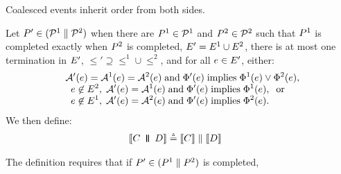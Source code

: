 Coalesced events inherit order from both sides.
\begin{definition}
  \label{def:par}
  Let $P' \in (\mathcal{P}^1 \parallel \mathcal{P}^2)$
  when there are $P^1 \in \mathcal{P}^1$ and $P^2 \in \mathcal{P}^2$
  such that
$P^1$ is completed exactly when $P^2$ is completed,
$E' = E^1 \cup E^2$,
there is at most one termination in $E'$,
${\le'}\supseteq{\le^1}\cup{\le^2}$,
and for all $e\in E'$,
either:
\begin{gather*}
  \begin{aligned}
    \;\;&\mathcal{A}'(e) = \mathcal{A}^1(e) = \mathcal{A}^2(e) \;\allowbreak\text{and}\allowbreak\; \Phi'(e) \; \allowbreak\text{implies}\allowbreak\; \Phi^1(e) \lor \Phi^2(e),\\[-1ex]
    &\;\;e \not\in E^2,\; \mathcal{A}'(e) = \mathcal{A}^1(e) \;\allowbreak\text{and}\allowbreak\; \Phi'(e) \; \allowbreak\text{implies}\allowbreak\; \Phi^1(e),\; \; \allowbreak\text{or}\allowbreak\;\\[-1ex]
    &\;\;e \not\in E^1,\; \mathcal{A}'(e) = \mathcal{A}^2(e) \;\allowbreak\text{and}\allowbreak\; \Phi'(e) \; \allowbreak\text{implies}\allowbreak\; \Phi^2(e).
  \end{aligned}
\end{gather*}
  We then define:
\begin{align*}
  \sem[\aThrd]{\aCmd \PAR[\bThrd][\bThrd'] \bCmd} & \eqdef
  \sem[\bThrd]{\aCmd} \parallel \sem[\bThrd']{\bCmd} 
\end{align*}
\end{definition}
The definition requires that if $P'\in(P^1 \parallel P^2)$ is completed,

